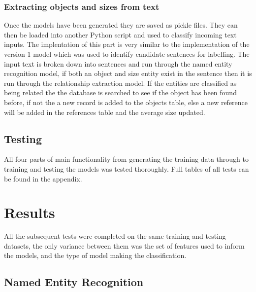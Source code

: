 \documentclass[11pt,oneside]{book}
\begin{document}
\subsection{Extracting objects and sizes from text}
Once the models have been generated they are saved as pickle files. They can then be loaded into another Python script and used to classify incoming text inputs. The implentation of this part is very similar to the implementation of the version 1 model which was used to identify candidate sentences for labelling. The input text is broken down into sentences and run through the named entity recognition model, if both an object and size entity exist in the sentence then it is run through the relationship extraction model. If the entities are classified as being related the the database is searched to see if the object has been found before, if not the a new record is added to the objects table, else a new reference will be added in the references table and the average size updated.


\section{Testing}

All four parts of main functionality from generating the training data through to training and testing the models was tested thoroughly. Full tables of all tests can be found in the appendix.

\chapter{Results}

All the subsequent tests were completed on the same training and testing datasets, the only variance between them was the set of features used to inform the models, and the type of model making the classification.

\section{Named Entity Recognition}
\end{document}
